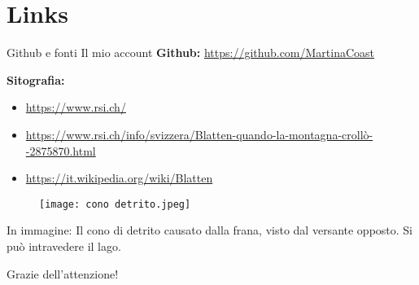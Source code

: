 \documentclass{beamer} %
\begin{document}
\section{Links}

\begin{frame}{Github e fonti}
Il mio account \textbf{Github:}
    \url{https://github.com/MartinaCoast}

\bigskip\textbf{Sitografia:}
\begin{itemize}
    \item\url{https://www.rsi.ch/}
    \item\url{https://www.rsi.ch/info/svizzera/Blatten-quando-la-montagna-crollò--2875870.html}
    \item\url{https://it.wikipedia.org/wiki/Blatten}
    
\end{itemize}
\end{frame}

\begin{frame}
    
    \begin{multicols}{2}
    \begin{figure}
        \centering
        \texttt{[image: cono detrito.jpeg]}
        \label{fig:placeholder}
    \end{figure}
    \columnbreak

     In immagine: Il cono di detrito causato dalla frana, visto dal versante opposto. Si può intravedere il lago.

    \bigskip
    \bigskip
    \begin{center}
        \Large {Grazie dell'attenzione!}
    \end{center}
    \end{multicols}
      
\end{frame}
\end{document}
